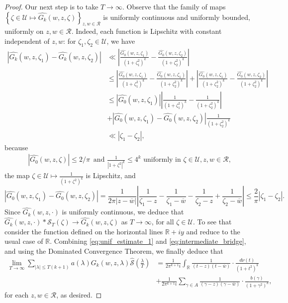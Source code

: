 \documentclass[a4paper,reqno,12pt]{amsart}
\newcommand{\R}{\mathcal{R}}
\renewcommand{\S}{\mathcal{S}}
\newcommand{\U}{\mathcal{U}}
\renewcommand{\r}{\mathbb{R}}
\newcommand{\ft}{\widehat}
\newcommand{\la}{\lambda}
\newcommand{\ga}{\gamma}
\newcommand{\ov}[1]{\overline{#1}}
\newcommand{\w}{\ov{w}}
\newcommand{\cd}{\cdot}
\newcommand{\1}{{\bf 1}}
\newcommand{\ra}{\rightarrow}
\newcommand{\mt}{\mapsto}
\begin{document}
\begin{proof}
Our next step is to take $T\ra\infty$. Observe that the family of maps $\left\{\zeta\in\U\mt\ft{G_k}(w,z,\zeta)\right\}_{z,w\in \R}$ is uniformly continuous and uniformly bounded, uniformly on $z,w\in\R$. Indeed, each function is Lipschitz with constant independent of $z,w$: for $\zeta_1,\zeta_2\in\U$, we have
\begin{align*}
\left|\ft{G_k}(w,z,\zeta_1)-\ft{G_k}(w,z,\zeta_2)\right|&\ll\left|\frac{\ft{G_0}(w,z,\zeta_1)}{(1+\zeta_1^2)^k}-\frac{\ft{G_0}(w,z,\zeta_2)}{(1+\zeta_2^2)^k}\right|\\
&\leq\left|\frac{\ft{G_0}(w,z,\zeta_1)}{(1+\zeta_1^2)^k}-\frac{\ft{G_0}(w,z,\zeta_1)}{(1+\zeta_2^2)^k}\right|+\left|\frac{\ft{G_0}(w,z,\zeta_1)}{(1+\zeta_2^2)^k}-\frac{\ft{G_0}(w,z,\zeta_2)}{(1+\zeta_2^2)^k}\right|\\
&\leq\left|\ft{G_0}(w,z,\zeta_1)\right|\left|\frac{1}{(1+\zeta_1^2)^k}-\frac{1}{(1+\zeta_2^2)^k}\right|\\
&+\left|\ft{G_0}(w,z,\zeta_1)-\ft{G_0}(w,z,\zeta_2)\right|\frac{1}{(1+\zeta_2^2)^k}\\
&\ll |\zeta_1-\zeta_2|,
\end{align*}
because
\begin{align*}
    \left|\ft{G_0}(w,z,\zeta)\right|\leq 2/\pi\, \text{ and } \frac{1}{\left|1+\zeta^2\right|^k}\leq 4^k \text{ uniformly in } \zeta\in\U,z,w\in\R,
\end{align*}
the map $\zeta\in\U\mt\frac{1}{(1+\zeta^2)^k}$ is Lipschitz, and 
\begin{equation}
|\ft{G_0}(w,z,\zeta_1)-\ft{G_0}(w,z,\zeta_2)|=\frac{1}{2\pi|z-\w|}\left|\frac{1}{\zeta_1-z}-\frac{1}{\zeta_1-\w}-\frac{1}{\zeta_2-z}+\frac{1}{\zeta_2-\w}\right|\leq\frac{2}{\pi}\left|\zeta_1-\zeta_2\right|.
\end{equation}
Since $\ft{G_k}(w,z,\cd)$ is uniformly continuous, we deduce that $\ft{G_k}(w,z,\cd)*\S_T(\zeta)\to \ft{G_k}(w,z,\zeta)$ as $T\ra\infty$, for all $\zeta\in\U$. To see that consider the function defined on the horizontal lines $\r+iy$ and reduce to the usual case of $\r$. Combining \eqref{eq:unif_estimate_1} and \eqref{eq:intermediate_bridge}, and using the Dominated Convergence Theorem, we finally deduce that
\begin{align*}
\lim_{T\ra\infty} \sum_{|\la|\leq T(k+1)} a(\la)G_k(w,z,\la)\ft{\S}\left(\frac{\la}{T}\right)&=\frac{1}{2\pi^{k+1}i}\int_{\r} \frac{1}{(t-z)(t-\w)}\cd\frac{d\nu(t)}{(1+t^2)^k}\\
&+\frac{1}{2\pi^{k+1}i}\sum_{\ga\in A} \frac{1}{(\ga-z)(\ga-\w)}\cd\frac{b(\ga)}{(1+\ga^2)^k},
\end{align*}
for each $z,w\in\R$, as desired. 
\end{proof}
\end{document}
